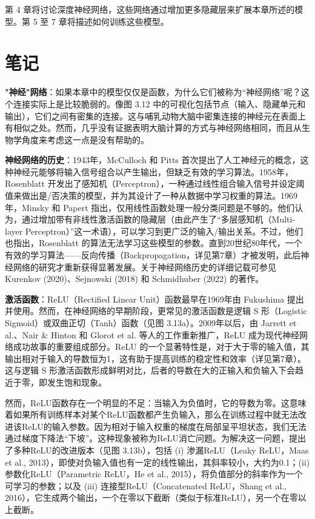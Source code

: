 \documentclass[lang=cn,newtx,10pt,scheme=chinese]{elegantbook}
\begin{document}
第 4 章将讨论深度神经网络，这些网络通过增加更多隐藏层来扩展本章所述的模型。第 5 至 7 章将描述如何训练这些模型。

\section{笔记}

\textbf{"神经"网络}：如果本章中的模型仅仅是函数，为什么它们被称为“神经网络”呢？这个连接实际上是比较脆弱的。像图 3.12 中的可视化包括节点（输入、隐藏单元和输出），它们之间有密集的连接。这与哺乳动物大脑中密集连接的神经元在表面上有相似之处。然而，几乎没有证据表明大脑计算的方式与神经网络相同，而且从生物学角度来考虑这一点是没有帮助的。

\textbf{神经网络的历史}：1943年，McCulloch 和 Pitts 首次提出了人工神经元的概念，这种神经元能够将输入信号组合以产生输出，但缺乏有效的学习算法。1958年，Rosenblatt 开发出了感知机（Perceptron），一种通过线性组合输入信号并设定阈值来做出是/否决策的模型，并为其设计了一种从数据中学习权重的算法。1969年，Minsky 和 Papert 指出，仅用线性函数处理一般分类问题是不够的。他们认为，通过增加带有非线性激活函数的隐藏层（由此产生了“多层感知机（Multi-layer Perceptron）”这一术语），可以学习到更广泛的输入/输出关系。不过，他们也指出，Rosenblatt 的算法无法学习这些模型的参数。直到20世纪80年代，一个有效的学习算法——反向传播（Backpropagation，详见第7章）才被发明，此后神经网络的研究才重新获得显著发展。关于神经网络历史的详细记载可参见 Kurenkov (2020)、Sejnowski (2018) 和 Schmidhuber (2022) 的著作。

\textbf{激活函数}：ReLU（Rectified Linear Unit）函数最早在1969年由 Fukushima 提出并使用。然而，在神经网络的早期阶段，更常见的激活函数是逻辑 S 形（Logistic Sigmoid）或双曲正切（Tanh）函数（见图 3.13a）。2009年以后，由 Jarrett et al.、Nair \& Hinton 和 Glorot et al. 等人的工作重新推广，ReLU 成为现代神经网络成功故事的重要组成部分。ReLU 的一个显著特性是，对于大于零的输入值，其输出相对于输入的导数恒为1，这有助于提高训练的稳定性和效率（详见第7章）。这与逻辑 S 形激活函数形成鲜明对比，后者的导数在大的正输入和负输入下会趋近于零，即发生饱和现象。

然而，ReLU函数存在一个明显的不足：当输入为负值时，它的导数为零。这意味着如果所有训练样本对某个ReLU函数都产生负输入，那么在训练过程中就无法改进该ReLU的输入参数。因为相对于输入权重的梯度在局部呈平坦状态，我们无法通过梯度下降法“下坡”。这种现象被称为ReLU消亡问题。为解决这一问题，提出了多种ReLU的改进版本（见图 3.13b），包括 (i) 渗漏ReLU（Leaky ReLU，Maas et al., 2013），即使对负输入值也有一定的线性输出，其斜率较小，大约为0.1；(ii) 参数化ReLU（Parametric ReLU，He et al., 2015），将负值部分的斜率作为一个可学习的参数；以及 (iii) 连接型ReLU（Concatenated ReLU，Shang et al., 2016），它生成两个输出，一个在零以下截断（类似于标准ReLU），另一个在零以上截断。
\end{document}
